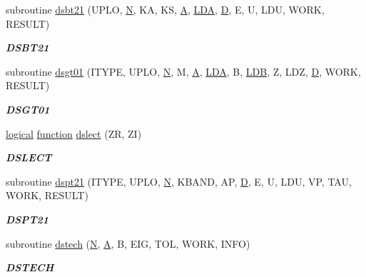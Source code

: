 \begin{DoxyCompactItemize}
subroutine \hyperlink{group__double__eig_ga0b9fe83560bacaba5de4d7ac54653b34}{dsbt21} (U\+P\+L\+O, \hyperlink{polmisc_8c_a0240ac851181b84ac374872dc5434ee4}{N}, K\+A, K\+S, \hyperlink{classA}{A}, \hyperlink{example__user_8c_ae946da542ce0db94dced19b2ecefd1aa}{L\+D\+A}, \hyperlink{odrpack_8h_a7dae6ea403d00f3687f24a874e67d139}{D}, E, U, L\+D\+U, W\+O\+R\+K, R\+E\+S\+U\+L\+T)
\begin{DoxyCompactList}\small\item\em {\bfseries D\+S\+B\+T21} \end{DoxyCompactList}\item 
subroutine \hyperlink{group__double__eig_ga928f4bcc4b7ac39d393fd7df69b1c6dd}{dsgt01} (I\+T\+Y\+P\+E, U\+P\+L\+O, \hyperlink{polmisc_8c_a0240ac851181b84ac374872dc5434ee4}{N}, M, \hyperlink{classA}{A}, \hyperlink{example__user_8c_ae946da542ce0db94dced19b2ecefd1aa}{L\+D\+A}, B, \hyperlink{example__user_8c_a50e90a7104df172b5a89a06c47fcca04}{L\+D\+B}, Z, L\+D\+Z, \hyperlink{odrpack_8h_a7dae6ea403d00f3687f24a874e67d139}{D}, W\+O\+R\+K, R\+E\+S\+U\+L\+T)
\begin{DoxyCompactList}\small\item\em {\bfseries D\+S\+G\+T01} \end{DoxyCompactList}\item 
\hyperlink{tnc_8c_aa7b64cdf39500931f7b333343791a104}{logical} \hyperlink{afunc_8m_a7b5e596df91eadea6c537c0825e894a7}{function} \hyperlink{group__double__eig_gab8c1ed076508e5ae3b39e824e27790cc}{dslect} (Z\+R, Z\+I)
\begin{DoxyCompactList}\small\item\em {\bfseries D\+S\+L\+E\+C\+T} \end{DoxyCompactList}\item 
subroutine \hyperlink{group__double__eig_gaecf7333dd6afe3a4fb228534b24c1533}{dspt21} (I\+T\+Y\+P\+E, U\+P\+L\+O, \hyperlink{polmisc_8c_a0240ac851181b84ac374872dc5434ee4}{N}, K\+B\+A\+N\+D, A\+P, \hyperlink{odrpack_8h_a7dae6ea403d00f3687f24a874e67d139}{D}, E, U, L\+D\+U, V\+P, T\+A\+U, W\+O\+R\+K, R\+E\+S\+U\+L\+T)
\begin{DoxyCompactList}\small\item\em {\bfseries D\+S\+P\+T21} \end{DoxyCompactList}\item 
subroutine \hyperlink{group__double__eig_gaee97881cc8f081baf0b4bf6bc4abfd46}{dstech} (\hyperlink{polmisc_8c_a0240ac851181b84ac374872dc5434ee4}{N}, \hyperlink{classA}{A}, B, E\+I\+G, T\+O\+L, W\+O\+R\+K, I\+N\+F\+O)
\begin{DoxyCompactList}\small\item\em {\bfseries D\+S\+T\+E\+C\+H} \end{DoxyCompactList}\item 

\end{DoxyCompactItemize}
